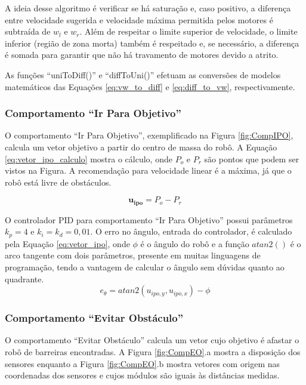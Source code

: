 	A ideia desse algoritmo é verificar se há saturação e, caso positivo, a diferença entre
	velocidade sugerida e velocidade máxima permitida pelos motores é subtraída de $w_l$ e 
	$w_r$. Além de respeitar o limite superior de velocidade, o limite inferior (região de 
	zona morta) também é respeitado e, se necessário, a diferença é somada para garantir que
	não há travamento de motores devido a atrito.
		
	As funções ``uniToDiff()'' e ``diffToUni()'' efetuam as conversões de modelos matemáticos
	das Equações \ref{eq:vw_to_diff} e \ref{eq:diff_to_vw}, respectivamente.
	
		\subsubsection{Comportamento ``Ir Para Objetivo'' \label{SEC:IPO}}
		
		O comportamento ``Ir Para Objetivo'', exemplificado na Figura \ref{fig:CompIPO}, calcula 
		um vetor objetivo a partir do centro de massa do robô. A Equação 
		\ref{eq:vetor_ipo_calculo} mostra o cálculo, onde $P_o$ e $P_r$ são pontos que podem ser 
		vistos na Figura. A recomendação para velocidade linear é a máxima, já que o robô 
		está livre de obstáculos.
		
		
		\begin{equation}
			\label{eq:vetor_ipo_calculo}
			\mathbf{u_{ipo}} = P_o - P_r
		\end{equation}
		
		O controlador PID para comportamento ``Ir Para Objetivo'' possui parâmetros $k_p = 4$ e 
		$k_i = k_d = 0,01$. O erro no ângulo, entrada do controlador, é calculado pela Equação
		\ref{eq:vetor_ipo}, onde $\phi$ é o ângulo do robô e a função $atan2()$ é o arco 
		tangente com dois parâmetros, presente em muitas linguagens de programação, 
		tendo a vantagem de calcular o ângulo sem dúvidas quanto ao quadrante.
		\begin{equation}
			\label{eq:vetor_ipo}
			e_\theta = atan2(u_{ipo,y}, u_{ipo,x}) - \phi
		\end{equation}
		
		\subsubsection{Comportamento ``Evitar Obstáculo''}
		
		O comportamento ``Evitar Obstáculo'' calcula um vetor cujo objetivo é afastar o robô de 
		barreiras encontradas. A Figura \ref{fig:CompEO}.a mostra a disposição dos 
		sensores enquanto a Figura \ref{fig:CompEO}.b mostra vetores com origem nas coordenadas dos 
		sensores e cujos módulos são iguais às distâncias medidas. 
		
